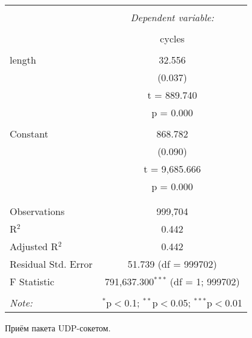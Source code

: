 \begin{table}[!htbp] \centering 
  \caption{} 
  \label{} 
\begin{tabular}{@{\extracolsep{5pt}}lc} 
\\[-1.8ex]\hline 
\hline \\[-1.8ex] 
 & \multicolumn{1}{c}{\textit{Dependent variable:}} \\ 
\cline{2-2} 
\\[-1.8ex] & cycles \\ 
\hline \\[-1.8ex] 
 length & 32.556 \\ 
  & (0.037) \\ 
  & t = 889.740 \\ 
  & p = 0.000 \\ 
  & \\ 
 Constant & 868.782 \\ 
  & (0.090) \\ 
  & t = 9,685.666 \\ 
  & p = 0.000 \\ 
  & \\ 
\hline \\[-1.8ex] 
Observations & 999,704 \\ 
R$^{2}$ & 0.442 \\ 
Adjusted R$^{2}$ & 0.442 \\ 
Residual Std. Error & 51.739 (df = 999702) \\ 
F Statistic & 791,637.300$^{***}$ (df = 1; 999702) \\ 
\hline 
\hline \\[-1.8ex] 
\textit{Note:}  & \multicolumn{1}{r}{$^{*}$p$<$0.1; $^{**}$p$<$0.05; $^{***}$p$<$0.01} \\ 
\end{tabular} 
\end{table} 

Приём пакета UDP-сокетом.

\clearpage
